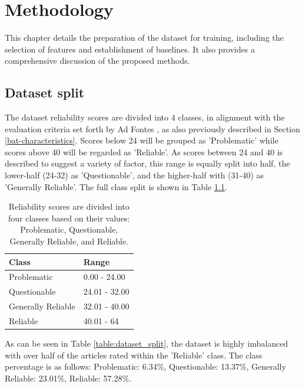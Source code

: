 \chapter{Methodology}
\label{cha:4}

This chapter details the preparation of the dataset for training, including the selection of features and establishment of baselines. It also provides a comprehensive discussion of the proposed methods.


\section{Dataset split}

The dataset reliability scores are divided into 4 classes, in alignment with the evaluation criteria set forth by Ad Fontes \cite{adfontes-bias-reliability}, as also previously described in Section \ref{bat-characteristics}. Scores below 24 will be grouped as 'Problematic' while scores above 40 will be regarded as 'Reliable'. As scores between 24 and 40 is described to suggest a variety of factor, this range is equally split into half, the lower-half (24-32) as 'Questionable', and the higher-half with (31-40) as 'Generally Reliable'. The full class split is shown in Table \ref{table:label_split}.

\begin{table}[htbp]
    \centering
    \begin{tabular}{| l | l |}
        \hline
        Class              & Range         \\
        \hline
        Problematic        & 0.00 - 24.00  \\
        Questionable       & 24.01 - 32.00 \\
        Generally Reliable & 32.01 - 40.00 \\
        Reliable           & 40.01 - 64    \\
        \hline
    \end{tabular}
    \caption{Reliability scores are divided into four classes based on their values: Problematic, Questionable, Generally Reliable, and Reliable.}
    \label{table:label_split}
\end{table}

As can be seen in Table \ref{table:dataset_split}, the dataset is highly imbalanced with over half of the articles rated within the 'Reliable' class. The class percentage is as follows: Problematic: 6.34\%, Questionable: 13.37\%, Generally Reliable: 23.01\%, Reliable: 57.28\%.

